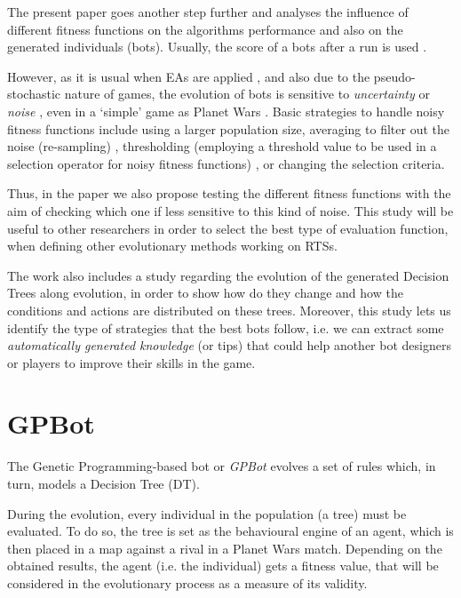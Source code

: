 \documentclass[preprint]{elsarticle}
\begin{document}
The present paper goes another step further and analyses the influence of different fitness functions on the algorithms performance and also on the generated individuals (bots). Usually, the score of a bots after a run is used \cite{StanleyBM05,LimBC10,ColeLM04}.

However, as it is usual when EAs are applied \cite{Jin2005303,QianYZ13}, and also due to the pseudo-stochastic nature of games, the evolution of bots is sensitive to {\em uncertainty} or {\em noise} \cite{merelo14:noisy}, even in a `simple' game as Planet Wars \cite{Mora_noisy_jcst}.
Basic strategies to handle noisy fitness functions include using a larger population size, averaging to filter out the noise (re-sampling) \cite{Branke98_robust}, thresholding (employing a threshold value to be used in a selection operator for noisy fitness functions) \cite{Markon2001_thresholding}, or changing the selection criteria.

Thus, in the paper we also propose testing the different fitness functions with the aim of checking which one if less sensitive to this kind of noise. This study will be useful to other researchers in order to select the best type of evaluation function, when defining other evolutionary methods working on RTSs.

The work also includes a study regarding the evolution of the generated Decision Trees along evolution, in order to show how do they change and how the conditions and actions are distributed on these trees. Moreover, this study lets us identify the type of strategies that the best bots follow, i.e. we can extract some {\em automatically generated knowledge} (or tips) that could help another bot designers or players to improve their skills in the game.


\section{GPBot}
\label{sec:agent}


The Genetic Programming-based bot or {\em GPBot} \cite{Garcia14Treedepth} evolves a set of rules which, in turn, models a Decision Tree (DT).

During the evolution, every individual in the population (a tree) must be evaluated. To do so, the tree is set as the behavioural engine of an agent, which is then placed in a map against a rival in a Planet Wars match. Depending on the obtained results, the agent (i.e. the individual) gets a fitness value, that will be considered in the evolutionary process as a measure of its validity. 
 
\end{document}
